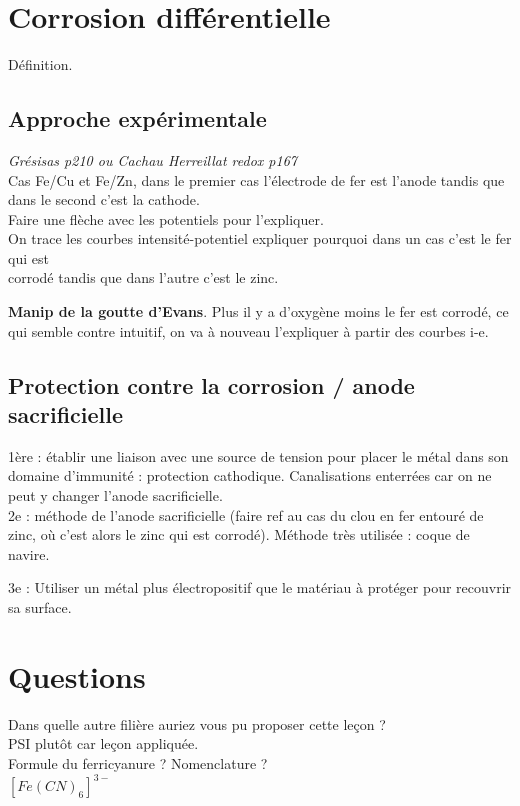 \documentclass[12pt,prb,aps,epsf]{article}
\begin{document}
\section{Corrosion différentielle}
	Définition.
	
\subsection{Approche expérimentale}
\textit{Grésisas p210 ou  Cachau Herreillat redox p167}\\
Cas Fe/Cu et Fe/Zn, dans le premier cas l'électrode de fer est l'anode tandis que dans le second c'est la cathode.\\

Faire une flèche avec les potentiels pour l'expliquer.\\

On trace les courbes intensité-potentiel expliquer pourquoi dans un cas c'est le fer qui est\\ corrodé tandis que dans l'autre c'est le zinc.

\textbf{Manip de la goutte d'Evans}. Plus il y a d'oxygène moins le fer est corrodé, ce qui semble contre intuitif, on va à nouveau l'expliquer à partir des courbes i-e.

\subsection{Protection contre la corrosion / anode sacrificielle}
1ère : établir une liaison avec une source de tension pour placer le métal dans son domaine d'immunité : protection cathodique. Canalisations enterrées car on ne peut y changer l'anode sacrificielle.\\

2e : méthode de l'anode sacrificielle (faire ref au cas du clou en fer entouré de zinc, où c'est alors le zinc qui est corrodé). Méthode très utilisée : coque de navire.

3e : Utiliser un métal plus électropositif que le matériau à protéger pour recouvrir sa surface.

\section*{Questions}
Dans quelle autre filière auriez vous pu proposer cette leçon ?\\
PSI plutôt car leçon appliquée.\\

Formule du ferricyanure ? Nomenclature ?\\
$[Fe(CN)_6]^{3-}$\\
\end{document}
